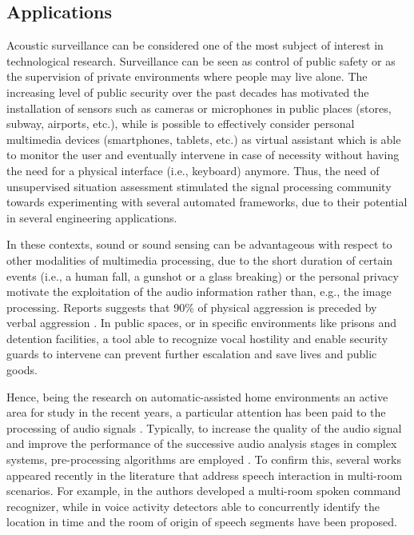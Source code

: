 \subsection{Applications}
Acoustic surveillance can be considered one of the most subject of interest in technological research. Surveillance can be seen as control of public safety or as the supervision of private environments where people may live alone.  The increasing level of public security over the past decades has motivated the installation of sensors such as cameras or microphones in public places (stores, subway, airports, etc.), while is possible to effectively consider personal multimedia devices (smartphones, tablets, etc.) as virtual assistant which is able to monitor the user and eventually intervene in case of necessity without having the need for a physical interface (i.e., keyboard) anymore.
Thus, the need of unsupervised situation assessment stimulated the signal processing community towards experimenting with several automated frameworks, due to their potential in several engineering applications.

In these contexts, sound or sound sensing can be advantageous with respect to other modalities of multimedia processing, due to the short duration of certain events (i.e., a human fall, a gunshot or a glass breaking) or the personal privacy motivate the exploitation of the audio information rather than, e.g., the image processing. Reports suggests that 90\% of physical aggression is preceded by verbal aggression \cite{boudoukha2011burnout}. In public spaces, or in specific environments like prisons and detention facilities, a tool able to recognize vocal hostility and enable security guards to intervene can prevent further escalation and save lives and public goods. 


Hence, being the research on automatic-assisted home environments an active area for study in the recent years, a particular attention has been paid to the processing of audio signals \cite{Gemmeke13,Vacher2015,Principi2015a}.
Typically, to increase the quality of the audio signal and improve the performance of the successive audio analysis stages in complex systems, pre-processing algorithms are employed \cite{loizou2013speech,Hussain2007,Rotili12b}. To confirm this, several works appeared recently in the literature that address speech interaction in multi-room scenarios. For example, in \cite{Rodomagoulakis2017} the authors developed a multi-room spoken command recognizer, while in \cite{Ferroni15a,Giannoulis2015,Katsamanis2014} voice activity detectors able to concurrently identify the location in time and the room of origin of speech segments have been proposed. 


